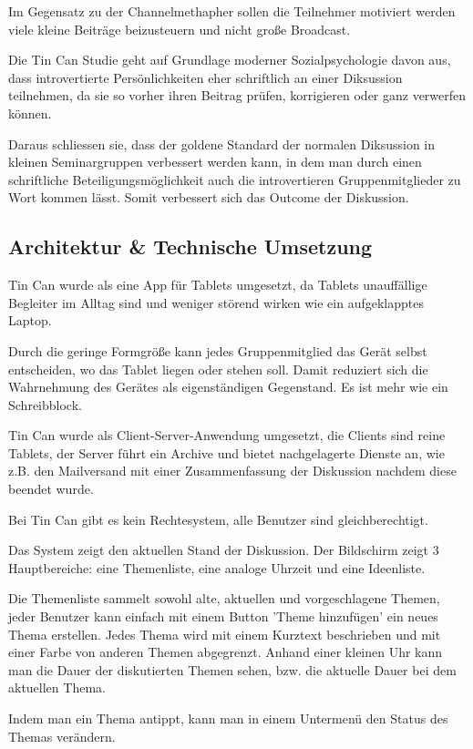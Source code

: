 Im Gegensatz zu der Channelmethapher sollen die Teilnehmer motiviert werden
viele kleine Beiträge beizusteuern und nicht große Broadcast.

Die Tin Can Studie geht auf Grundlage moderner Sozialpsychologie davon aus, dass
introvertierte Persönlichkeiten eher schriftlich an einer Diksussion teilnehmen,
da sie so vorher ihren Beitrag prüfen, korrigieren oder ganz verwerfen können.

Daraus schliessen sie, dass der goldene Standard der normalen Diksussion in
kleinen Seminargruppen verbessert werden kann, in dem man durch einen
schriftliche Beteiligungsmöglichkeit auch die introvertieren Gruppenmitglieder
zu Wort kommen lässt. Somit verbessert sich das Outcome der Diskussion.
 
\subsection{Architektur \& Technische Umsetzung}
Tin Can wurde als eine App für Tablets umgesetzt, da Tablets unauffällige
Begleiter im Alltag sind und weniger störend wirken wie ein aufgeklapptes
Laptop.

Durch die geringe Formgröße kann jedes Gruppenmitglied das Gerät selbst
entscheiden, wo das Tablet liegen oder stehen soll. Damit reduziert sich die
Wahrnehmung des Gerätes als eigenständigen Gegenstand. Es ist mehr wie ein
Schreibblock.

Tin Can wurde als Client-Server-Anwendung umgesetzt, die Clients sind reine
Tablets, der Server führt ein Archive und bietet nachgelagerte Dienste an, wie
z.B. den Mailversand mit einer Zusammenfassung der Diskussion nachdem diese
beendet wurde.

Bei Tin Can gibt es kein Rechtesystem, alle Benutzer sind gleichberechtigt.

Das System zeigt den aktuellen Stand der Diskussion. Der Bildschirm zeigt 3
Hauptbereiche: eine Themenliste, eine analoge Uhrzeit und eine Ideenliste.

Die Themenliste sammelt sowohl alte, aktuellen und vorgeschlagene Themen, jeder
Benutzer kann einfach mit einem Button 'Theme hinzufügen' ein neues Thema
erstellen. Jedes Thema wird mit einem Kurztext beschrieben und mit einer Farbe
von anderen Themen abgegrenzt. Anhand einer kleinen Uhr kann man die Dauer der
diskutierten Themen sehen, bzw. die aktuelle Dauer bei dem aktuellen Thema.

Indem man ein Thema antippt, kann man in einem Untermenü den Status des Themas
verändern.

